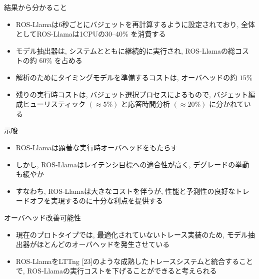 \begin{frame}{結果から分かること}
    \begin{itemize}
        \item ROS-Llamaは6秒ごとにバジェットを再計算するように設定されており, 全体としてROS-Llamaは1CPUの30--40\% を消費する
        \item モデル抽出器は, システムとともに継続的に実行され, ROS-Llamaの総コストの約 $60 \%$ を占める
        \item 解析のためにタイミングモデルを準備するコストは, オーバヘッドの約 $15 \%$
        \item 残りの実行時コストは, バジェット選択プロセスによるもので, バジェット編成ヒューリスティック $(\approx 5 \%)$ と応答時間分析 $(\approx 20 \%)$ に分かれている
    \end{itemize}
\end{frame}

\begin{frame}{示唆}
    \begin{itemize}
        \item ROS-Llamaは顕著な実行時オーバヘッドをもたらす
        \item しかし, ROS-Llamaはレイテンシ目標への適合性が高く, デグレードの挙動も緩やか
        \item すなわち, ROS-Llamaは大きなコストを伴うが, 性能と予測性の良好なトレードオフを実現するのに十分な利点を提供する
    \end{itemize}
\end{frame}

\begin{frame}{オーバヘッド改善可能性}
    \begin{itemize}
        \item 現在のプロトタイプでは, 最適化されていないトレース実装のため, モデル抽出器がほとんどのオーバヘッドを発生させている
        \item ROS-LlamaをLTTng [23]のような成熟したトレースシステムと統合することで, ROS-Llamaの実行コストを下げることができると考えられる
    \end{itemize}
\end{frame}
